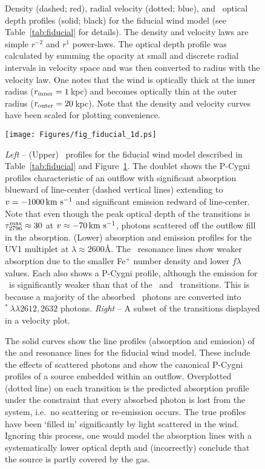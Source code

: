 \documentclass[12pt,preprint]{aastex}
\begin{document}
\begin{figure}
\caption{
Density (dashed; red), radial velocity (dotted; blue), and
\mgiia\ optical depth profiles (solid; black) for the fiducial
wind model (see Table~\ref{tab:fiducial} for details).
The density and velocity laws are simple $r^{-2}$ and $r^1$
power-laws.  The optical depth profile was calculated by summing
the opacity at small and discrete radial intervals in velocity space
and was then converted to radius with the velocity law.  One notes that
the wind is optically thick at the inner radius ($r_{\rm inner} =
1$\,kpc) and becomes optically thin at the outer radius ($r_{\rm
  outer} = 20$\,kpc).
Note that the density and velocity curves have been scaled for plotting
convenience.  
}
\label{fig:fiducial_nvt}
\end{figure}

\begin{figure}
\texttt{[image: Figures/fig\_fiducial\_1d.ps]}
\caption{
{\it Left} -- (Upper) \mgiid\ profiles for the fiducial wind model
described in Table~\ref{tab:fiducial} and
Figure~\ref{fig:fiducial_nvt}.  The doublet shows the P-Cygni profiles
characteristic of an outflow with significant absorption blueward of
line-center (dashed vertical lines) extending to $v = -1000\, {\rm km~s^{-1}}$
and significant emission redward of line-center.  Note
that even though the peak optical depth of the  transitions
is $\tau_{2796}^{\rm max} \approx 30$ at $v \approx -70 \, {\rm km~s^{-1}}$,
photons scattered off the outflow fill in the absorption.
(Lower)  absorption and emission profiles for the UV1
multiplet at $\lambda \approx 2600$\AA.  The \feiid\ resonance lines 
show weaker absorption due to the smaller Fe$^+$ number density and
lower $f\lambda$ values.  Each also shows a P-Cygni profile, although
the emission for \feiia\ is significantly weaker than that of the
\feiib\ and \mgiid\ transitions.  This is because a majority of the
absorbed \feiia\ photons are converted into
$^*~\lambda\lambda 2612, 2632$ photons.
{\it Right} -- A subset of the transitions displayed in a velocity
plot.
}
\label{fig:fiducial_1d}
\end{figure}

\begin{figure}
\caption{
The solid curves show the line profiles (absorption and emission) of
the  and  resonance lines for the fiducial wind
model.  These include the effects of scattered photons and show the
canonical P-Cygni profiles of a source 
embedded within an outflow.  Overplotted (dotted line) on each transition is
the predicted absorption profile under the constraint that every
absorbed photon is lost from the system, i.e.\ no scattering or
re-emission occurs.   The true profiles have been `filled
in' significantly by light scattered in the wind.  Ignoring this
process, one would model the absorption lines with a systematically lower
optical depth and (incorrectly) conclude that the source is partly covered by the
gas.  
}
\label{fig:noemiss}
\end{figure}
\end{document}
